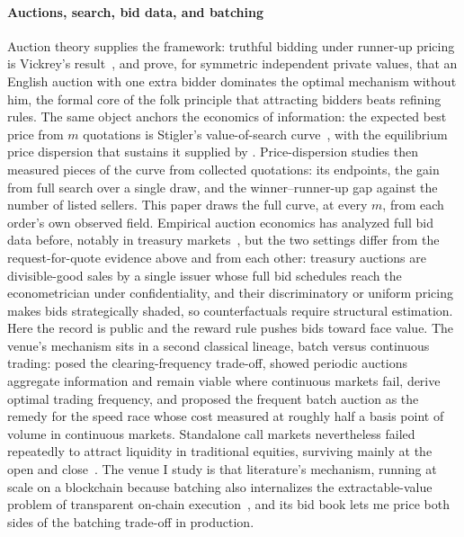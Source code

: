 \documentclass[11pt]{article}
\theoremstyle{plain}
\theoremstyle{definition}
\theoremstyle{remark}
\begin{document}
\paragraph{Auctions, search, bid data, and batching} Auction theory supplies the framework: truthful bidding under runner-up pricing is Vickrey's result~\citep{vickrey1961counterspeculation}, and \citet{bulow1996auctions} prove, for symmetric independent private values, that an English auction with one extra bidder dominates the optimal mechanism without him, the formal core of the folk principle that attracting bidders beats refining rules. The same object anchors the economics of information: the expected best price from $m$ quotations is Stigler's value-of-search curve~\citep{stigler1961information}, with the equilibrium price dispersion that sustains it supplied by \citet{burdett1983dispersion}. Price-dispersion studies then measured pieces of the curve from collected quotations: \citet{pratt1979price} its endpoints, the gain from full search over a single draw, and \citet{baye2004price} the winner--runner-up gap against the number of listed sellers. This paper draws the full curve, at every $m$, from each order's own observed field. Empirical auction economics has analyzed full bid data before, notably in treasury markets~\citep{hortacsu2010mechanism,kastl2011discrete}, but the two settings differ from the request-for-quote evidence above and from each other: treasury auctions are divisible-good sales by a single issuer whose full bid schedules reach the econometrician under confidentiality, and their discriminatory or uniform pricing makes bids strategically shaded, so counterfactuals require structural estimation. Here the record is public and the reward rule pushes bids toward face value. The venue's mechanism sits in a second classical lineage, batch versus continuous trading: \citet{garbade1979clearing} posed the clearing-frequency trade-off, \citet{madhavan1992trading} showed periodic auctions aggregate information and remain viable where continuous markets fail, \citet{du2017frequency} derive optimal trading frequency, and \citet{budish2015hft} proposed the frequent batch auction as the remedy for the speed race whose cost \citet{aquilina2022quantifying} measured at roughly half a basis point of volume in continuous markets. Standalone call markets nevertheless failed repeatedly to attract liquidity in traditional equities, surviving mainly at the open and close~\citep{pagano2003closing}. The venue I study is that literature's mechanism, running at scale on a blockchain because batching also internalizes the extractable-value problem of transparent on-chain execution~\citep{daian2020flashboys}, and its bid book lets me price both sides of the batching trade-off in production.
\end{document}
